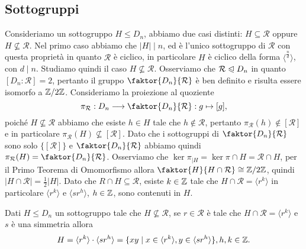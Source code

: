 \documentclass[11pt]{scrartcl}
\begin{document}
\subsection{Sottogruppi}

Consideriamo un sottogruppo $H\leq D_n$, abbiamo due casi distinti: 
$H \subseteq \mathcal{R}$ oppure $H \nsubseteq \mathcal{R}$. Nel primo caso
abbiamo che $|H|\mid n$, ed è l'unico sottogruppo di $\mathcal{R}$ con questa 
proprietà in quanto $\mathcal{R}$ è ciclico, in particolare $H$ è ciclico 
della forma $\langle ^{\frac n d}\rangle$, con $d \mid n$. \newline
Studiamo quindi il caso $H \nsubseteq \mathcal{R}$. Osserviamo che 
$\mathcal{R}\trianglelefteqslant D_n$ in quanto $[D_n : \mathcal{R}] = 2$,
pertanto il gruppo $\faktor{D_n}{\mathcal{R}}$ è ben definito e risulta essere 
isomorfo a $\mathbb{Z}/{2}\mathbb{Z}$. \newline
Consideriamo la proiezione al quoziente \[
    \pi_{\mathcal{R}}: D_n \longrightarrow \faktor{D_n}{\mathcal{R}} : g \mapsto [g],
\]poiché $H \nsubseteq \mathcal{R}$ abbiamo che esiste $h \in H$ tale che 
$h \notin \mathcal{R}$, pertanto $\pi_{\mathcal{R}}(h) \notin [\mathcal{R}]$ e
in particolare $\pi_{\mathcal{R}}(H) \nsubseteq [\mathcal{R}]$. Dato che i 
sottogruppi di $\faktor{D_n}{\mathcal{R}}$ sono solo $\{[\mathcal{R}]\}$ e
$\faktor{D_n}{\mathcal{R}}$ abbiamo quindi $\pi_{\mathcal{R}}(H) = 
\faktor{D_n}{\mathcal{R}}$. Osserviamo che $\ker \pi_{\mid H} = 
\ker \pi \cap H = \mathcal{R}\cap H$, per il Primo Teorema di Omomorfismo
allora $\faktor{H}{H\cap \mathcal{R}} \cong \Z2$, quindi 
$|H\cap\mathcal{R}| = \displaystyle\frac 1 2 |H|$. Dato che $R\cap H \subseteq
\mathcal{R}$, esiste $k \in \mathbb Z$ tale che $H\cap\mathcal{R} = \langle r^k\rangle$
in particolare $\langle r^k\rangle$ e $\langle sr^h\rangle$, $h \in \mathbb Z$, sono
contenuti in $H$. 

\begin{proposition}
    \label{prop2.0}
    Dati $H\leq D_n$ un sottogruppo tale che $H\nsubseteq \mathcal{R}$, se
    $r \in \mathcal{R}$ è tale che $H\cap\mathcal{R} = \langle r^k\rangle$ 
    e $s$ è una simmetria allora \[
    H = \langle r^k\rangle\cdot\langle sr^h\rangle = \{xy \mid x \in \langle r^k\rangle,
    y \in \langle sr^h\rangle\}, h, k \in \mathbb Z.    
    \]
\end{proposition}
\end{document}
